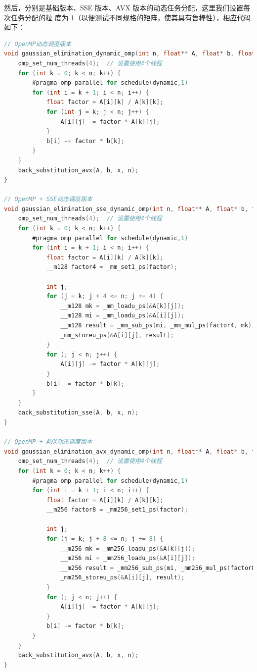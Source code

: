 \documentclass{nku}
\begin{document}
然后，分别是基础版本、SSE 版本、AVX 版本的动态任务分配，这里我们设置每次任务分配的粒
度为 1（以便测试不同规格的矩阵，使其具有鲁棒性），相应代码如下：
\begin{lstlisting}[language=C]
// OpenMP动态调度版本
void gaussian_elimination_dynamic_omp(int n, float** A, float* b, float* x) {
    omp_set_num_threads(4);  // 设置使用4个线程
    for (int k = 0; k < n; k++) {
        #pragma omp parallel for schedule(dynamic,1)
        for (int i = k + 1; i < n; i++) {
            float factor = A[i][k] / A[k][k];
            for (int j = k; j < n; j++) {
                A[i][j] -= factor * A[k][j];
            }
            b[i] -= factor * b[k];
        }
    }
    back_substitution_avx(A, b, x, n);
}

// OpenMP + SSE动态调度版本
void gaussian_elimination_sse_dynamic_omp(int n, float** A, float* b, float* x) {
    omp_set_num_threads(4);  // 设置使用4个线程
    for (int k = 0; k < n; k++) {
        #pragma omp parallel for schedule(dynamic,1)
        for (int i = k + 1; i < n; i++) {
            float factor = A[i][k] / A[k][k];
            __m128 factor4 = _mm_set1_ps(factor);

            int j;
            for (j = k; j + 4 <= n; j += 4) {
                __m128 mk = _mm_loadu_ps(&A[k][j]);
                __m128 mi = _mm_loadu_ps(&A[i][j]);
                __m128 result = _mm_sub_ps(mi, _mm_mul_ps(factor4, mk));
                _mm_storeu_ps(&A[i][j], result);
            }
            for (; j < n; j++) {
                A[i][j] -= factor * A[k][j];
            }
            b[i] -= factor * b[k];
        }
    }
    back_substitution_sse(A, b, x, n);
}

// OpenMP + AVX动态调度版本
void gaussian_elimination_avx_dynamic_omp(int n, float** A, float* b, float* x) {
    omp_set_num_threads(4);  // 设置使用4个线程
    for (int k = 0; k < n; k++) {
        #pragma omp parallel for schedule(dynamic,1)
        for (int i = k + 1; i < n; i++) {
            float factor = A[i][k] / A[k][k];
            __m256 factor8 = _mm256_set1_ps(factor);

            int j;
            for (j = k; j + 8 <= n; j += 8) {
                __m256 mk = _mm256_loadu_ps(&A[k][j]);
                __m256 mi = _mm256_loadu_ps(&A[i][j]);
                __m256 result = _mm256_sub_ps(mi, _mm256_mul_ps(factor8, mk));
                _mm256_storeu_ps(&A[i][j], result);
            }
            for (; j < n; j++) {
                A[i][j] -= factor * A[k][j];
            }
            b[i] -= factor * b[k];
        }
    }
    back_substitution_avx(A, b, x, n);
}
\end{lstlisting}
\end{document}
